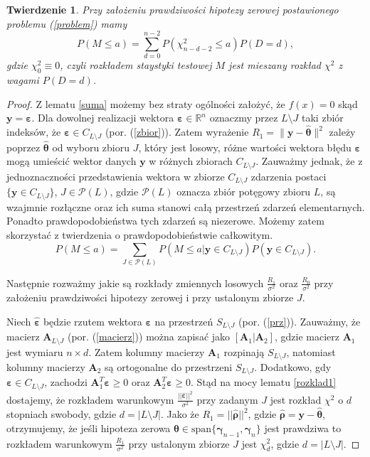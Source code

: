 \documentclass[12pt]{mwart}
\newtheorem{tw}{Twierdzenie}
\begin{document}
\begin{tw}\label{statystyka}
Przy założeniu prawdziwości hipotezy zerowej postawionego problemu (\ref{problem}) mamy
\begin{displaymath}
P(M\leq a)=\sum_{d=0}^{n-2}{P(\chi^2_{n-d-2}\leq a)P(D=d)},
\end{displaymath}
gdzie $\chi^2_0\equiv 0$, czyli rozkładem staystyki testowej $M$ jest mieszany rozkład $\chi^2$ z wagami $P(D=d)$.
\end{tw}
\begin{proof}
Z lematu \ref{suma} możemy bez straty ogólności założyć, że $f(x)=0$ skąd $\pmb{y}=\pmb{\varepsilon}$. Dla dowolnej realizacji wektora $\pmb{\varepsilon}\in \mathbb{R}^n$ oznaczmy przez $L\setminus J$ taki zbiór indeksów, że $\pmb{\varepsilon}\in C_{L\setminus J}$ (por. (\ref{zbior})). Zatem wyrażenie $R_1=\|\pmb{y}-\hat{\pmb{\theta}}\|^2$ zależy poprzez $\hat{\pmb{\theta}}$ od wyboru zbioru $J$, który jest losowy, różne wartości wektora błędu $\pmb{\varepsilon}$ mogą umieścić wektor danych $\pmb{y}$ w różnych zbiorach $C_{L\setminus J}$. Zauważmy jednak, że z jednoznaczności przedstawienia wektora w zbiorze $C_{L\setminus J}$ zdarzenia postaci $\{\pmb{y}\in C_{L\setminus J}\}$, $J\in \mathcal{P}(L)$, gdzie $\mathcal{P}(L)$ oznacza zbiór potęgowy zbioru $L$, są wzajmnie rozłączne oraz ich suma stanowi całą przestrzeń zdarzeń elementarnych. Ponadto prawdopodobieństwa tych zdarzeń są niezerowe. Możemy zatem skorzystać z twierdzenia o prawdopodobieństwie całkowitym.
\begin{displaymath}
P(M\leq a)=\sum_{J\in \mathcal{P}(L)}{P(M\leq a|\pmb{y}\in C_{L\setminus J})P(\pmb{y}\in C_{L\setminus J})}.
\end{displaymath}

Następnie rozważmy jakie są rozkłady zmiennych losowych $\frac{R_1}{\sigma^2}$ oraz $\frac{R_0}{\sigma^2}$ przy założeniu prawdziwości hipotezy zerowej i przy ustalonym zbiorze $J$.


Niech $\hat{\pmb{\varepsilon}}$ będzie rzutem wektora $\pmb{\varepsilon}$ na przestrzeń $S_{L\setminus J}$ (por. (\ref{prz})). Zauważmy, że macierz $\pmb{A}_{L\setminus J}$ (por. (\ref{macierz})) można zapisać jako $[\pmb{A}_1|\pmb{A}_2]$, gdzie macierz $\pmb{A}_1$ jest wymiaru $n\times d$. Zatem kolumny macierzy $\pmb{A}_1$ rozpinają $S_{L\setminus J}$, natomiast kolumny macierzy $\pmb{A}_2$ są ortogonalne do przestrzeni $S_{L\setminus J}$. Dodatkowo, gdy $\pmb{\varepsilon}\in C_{L\setminus J}$, zachodzi $\pmb{A}_1^T\pmb{\varepsilon} \geq 0$ oraz $\pmb{A}^T_2\pmb{\varepsilon} \geq 0$. Stąd na mocy lematu \ref{rozklad1} dostajemy, że rozkładem warunkowym $\frac{||\hat{\pmb{\varepsilon}}||^2}{\sigma^2}$ przy zadanym $J$ jest rozkład $\chi^2$ o $d$ stopniach swobody, gdzie $d=|L\setminus J|$. Jako że $R_1=||\hat{\pmb{\rho}}||^2$, gdzie $\hat{\pmb{\rho}}=\pmb{y}-\hat{\pmb{\theta}}$, otrzymujemy, że jeśli hipoteza zerowa $\pmb{\theta}\in \textrm{span}\{\pmb{\gamma}_{n-1},\pmb{\gamma}_{n}\}$ jest prawdziwa to rozkładem warunkowym $\frac{R_1}{\sigma^2}$ przy ustalonym zbiorze $J$ jest $\chi^2_d$, gdzie $d=|L\setminus J|$. 


\end{proof}
\end{document}

